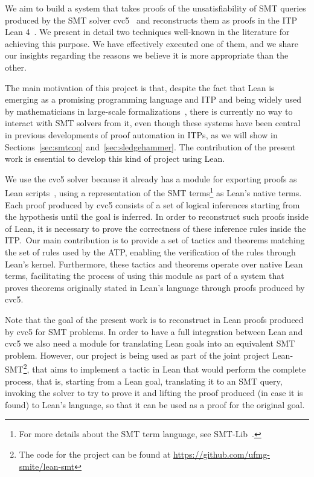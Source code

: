 We aim to build a system that takes proofs of the unsatisfiability of
SMT queries produced by the SMT solver cvc5~\cite{cvc5} and
reconstructs them as proofs in the ITP Lean 4~\cite{lean}.
We present in detail two techniques well-known in the literature for achieving this purpose.
We have effectively executed one of them, and we share our insights
regarding the reasons we believe it is more appropriate than the other.

The main motivation of this project is that, despite the fact that Lean is
emerging as a promising programming language and ITP and being
widely used by mathematicians in large-scale
formalizations~\cite{mathlib, scholze}, there is currently no way to
interact with SMT solvers from it, even though these systems have been
central in previous developments of proof automation in ITPs, as we will show in Sections~\ref{sec:smtcoq}
and~\ref{sec:sledgehammer}. The contribution of the present work
is essential to develop this kind of project using Lean.

We use the cvc5 solver because it already has a module for exporting proofs as
Lean scripts~\cite{Barbosa2022}, using a representation of the SMT terms\footnote{For more details
about the SMT term language, see SMT-Lib~\cite{smtlib}.} as Lean's native terms.
Each proof produced by cvc5 consists of a set of logical inferences starting from the
hypothesis until the goal is inferred. In order to reconstruct such proofs inside of
Lean, it is necessary to prove the correctness of these inference rules inside the
ITP.\ Our main contribution is to provide a set of tactics and theorems matching the set
of rules used by the ATP, enabling the verification of the rules through Lean's kernel.
Furthermore, these tactics and theorems operate over native Lean terms, facilitating the
process of using this module as part of a system that proves theorems originally stated
in Lean's language through proofs produced by cvc5.

Note that the goal of the present work is to reconstruct in Lean proofs produced by
cvc5 for SMT problems. In order to have a full integration between Lean and cvc5 we also
need a module for translating Lean goals into an equivalent SMT problem.
However, our project is being used as part of the joint project Lean-SMT\footnote{The
  code for the project can be found at \url{https://github.com/ufmg-smite/lean-smt}},
that aims to implement a tactic in Lean that would perform the complete process, that is,
starting from a Lean goal, translating it to an SMT query, invoking the solver to try
to prove it and lifting the proof produced (in case it is found) to Lean's language,
so that it can be used as a proof for the original goal.
